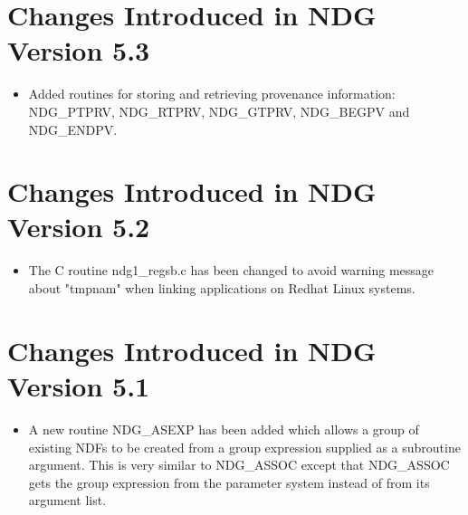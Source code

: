 \section{Changes Introduced in NDG Version 5.3}
\begin{itemize}
   \item Added routines for storing and retrieving provenance information:
         NDG\_PTPRV, NDG\_RTPRV, NDG\_GTPRV, NDG\_BEGPV and NDG\_ENDPV.
\end{itemize}

\section{Changes Introduced in NDG Version 5.2}
\begin{itemize}
   \item The C routine ndg1\_regsb.c has been changed to avoid warning 
         message about "tmpnam" when linking applications on Redhat Linux 
	 systems.
\end{itemize}

\section{Changes Introduced in NDG Version 5.1}
\begin{itemize}
   \item A new routine NDG\_ASEXP has been added which allows a group of
         existing NDFs to be created from a group expression supplied as 
         a subroutine argument. This is very similar to NDG\_ASSOC except
         that NDG\_ASSOC gets the group expression from the parameter system
         instead of from its argument list.
\end{itemize}


